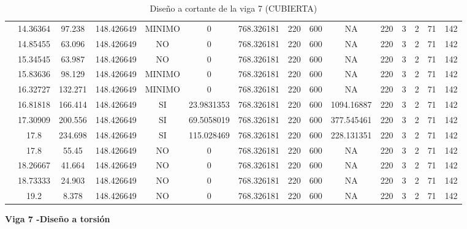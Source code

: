 \begin{table}[H]
{\begin{tabular}{|c|c|c|c|c|c|c|c|c|c|c|c|c|c|c|}
\cline{2-15}    & 14.36364 & 97.238 & 148.426649 & MINIMO & 0   & 768.326181 & 220 & 600 & NA  & 220 & 3   & 2   & 71  & 142 \bigstrut\\
\cline{2-15}    & 14.85455 & 63.096 & 148.426649 & NO  & 0   & 768.326181 & 220 & 600 & NA  & 220 & 3   & 2   & 71  & 142 \bigstrut\\
\cline{2-15}    & 15.34545 & 63.987 & 148.426649 & NO  & 0   & 768.326181 & 220 & 600 & NA  & 220 & 3   & 2   & 71  & 142 \bigstrut\\
\cline{2-15}    & 15.83636 & 98.129 & 148.426649 & MINIMO & 0   & 768.326181 & 220 & 600 & NA  & 220 & 3   & 2   & 71  & 142 \bigstrut\\
\cline{2-15}    & 16.32727 & 132.271 & 148.426649 & MINIMO & 0   & 768.326181 & 220 & 600 & NA  & 220 & 3   & 2   & 71  & 142 \bigstrut\\
\cline{2-15}    & 16.81818 & 166.414 & 148.426649 & SI  & 23.9831353 & 768.326181 & 220 & 600 & 1094.16887 & 220 & 3   & 2   & 71  & 142 \bigstrut\\
\cline{2-15}    & 17.30909 & 200.556 & 148.426649 & SI  & 69.5058019 & 768.326181 & 220 & 600 & 377.545461 & 220 & 3   & 2   & 71  & 142 \bigstrut\\
\cline{2-15}    & 17.8 & 234.698 & 148.426649 & SI  & 115.028469 & 768.326181 & 220 & 600 & 228.131351 & 220 & 3   & 2   & 71  & 142 \bigstrut\\
\cline{2-15}    & 17.8 & 55.45 & 148.426649 & NO  & 0   & 768.326181 & 220 & 600 & NA  & 220 & 3   & 2   & 71  & 142 \bigstrut\\
\cline{2-15}    & 18.26667 & 41.664 & 148.426649 & NO  & 0   & 768.326181 & 220 & 600 & NA  & 220 & 3   & 2   & 71  & 142 \bigstrut\\
\cline{2-15}    & 18.73333 & 24.903 & 148.426649 & NO  & 0   & 768.326181 & 220 & 600 & NA  & 220 & 3   & 2   & 71  & 142 \bigstrut\\
\cline{2-15}    & 19.2 & 8.378 & 148.426649 & NO  & 0   & 768.326181 & 220 & 600 & NA  & 220 & 3   & 2   & 71  & 142 \bigstrut\\
\hline
\end{tabular}%



  
 
  }%
    \caption{Diseño a cortante de la viga 7 (CUBIERTA) }
  \label{tab:C VG7 CUB }%
\end{table}%
\newpage
\textbf{Viga 7 -Diseño a torsión}
